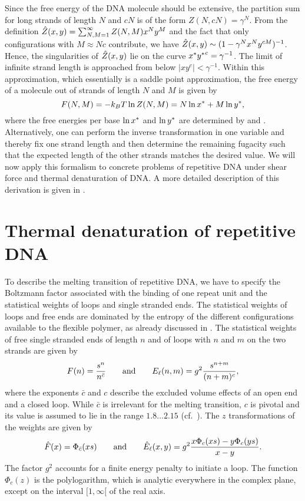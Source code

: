 Since the free energy of the DNA molecule should be extensive, the partition sum for long strands of 
length $N$ and $cN$ is of the form $Z(N, cN )= \gamma^{N}$.
From the definition $\hat{Z}(x,y)=\sum_{N,M=1}^{\infty} Z(N,M)x^{N}y^{M}$ and the fact that only 
configurations with $M\approx Nc$ contribute, we have 
$\hat{Z}(x,y)\sim(1-\gamma^{N}x^{N}y^{cM})^{-1}$. Hence, the singularities of $\hat{Z}(x,y)$ lie on the curve 
${x^*}{y^*}^{c}=\gamma^{-1}$. The limit of infinite strand length is approached from below $|xy^{c}|<\gamma^{-1}$. 
Within this approximation, which essentially is a saddle point approximation, the free energy of a 
molecule out of strands of length $N$ and $M$ is given by 
\begin{equation}
\label{eq:free_energy}
   F(N,M)=-k_BT\ln Z(N,M) = N \ln {x^*} + M \ln {y^*},
\end{equation}
where the free energies per base $\ln {x^*}$ and $\ln {y^*}$ are determined by  and 
. Alternatively, one can perform the inverse transformation in one variable and thereby 
fix one strand length and then determine the remaining fugacity such that the expected length of the 
other strands matches the desired value. We will now apply this formalism to concrete problems of
repetitive DNA under shear force and thermal denaturation of DNA. 
A more detailed description of this derivation is given in .
 
\section{Thermal denaturation of repetitive DNA}
To describe the melting transition of repetitive DNA, we have to specify the Boltzmann factor associated with
the binding of one repeat unit and the statistical weights of loops and single stranded ends. 
The statistical weights of loops and free ends are dominated by the entropy of the different 
configurations available to the flexible polymer, as already discussed in . 
The statistical weights of free single stranded ends of length $n$ and of loops with $n$ and $m$
on the two strands are given by
\begin{equation}
F(n)=\frac{s^n}{n^{\bar{c}}} \qquad \mathrm{and} \qquad {E_{\ell}}(n,m)=g^{2}\frac{s^{n+m}}{(n+m)^c},
\end{equation}
where the exponents $\bar{c}$ and $c$ describe the excluded volume effects of an open end and 
a closed loop. While $\bar{c}$ is irrelevant for the melting transition, $c$ is pivotal and its value is assumed 
to lie in the range $1.8\ldots2.15$ \cite{Kafri_PRL_00} (cf.~). 
The $z$ transformations of the weights are given by
\begin{equation}
\hat{F}(x)=\Phi_{\bar{c}}(xs) \qquad \mathrm{and} \qquad {\hat{E}_{\ell}}(x,y)=g^{2}\frac{x\Phi_c(xs)-y\Phi_c(ys)}{x-y}.
\end{equation}
The factor $g^{2}$ accounts for a finite energy penalty to initiate a loop. The function $\Phi_c(z)$
is the polylogarithm, which is analytic everywhere in the complex plane, except on the interval
$[1,\infty[$ of the real axis. 

